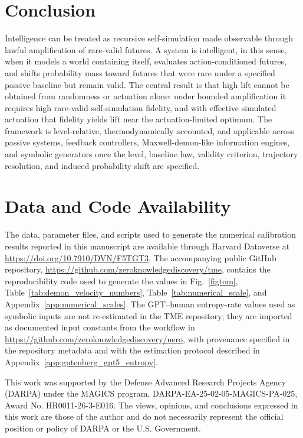 \documentclass[
  aps,
  prresearch,
  reprint,
  amsmath,
  amssymb,
  superscriptaddress,
  nofootinbib,
  longbibliography
]{revtex4-2}
\begin{document}
\section{Conclusion}
\label{sec:conclusion}

Intelligence can be treated as recursive self-simulation made observable through lawful amplification of rare-valid futures. A system is intelligent, in this sense, when it models a world containing itself, evaluates action-conditioned futures, and shifts probability mass toward futures that were rare under a specified passive baseline but remain valid. The central result is that high lift cannot be obtained from randomness or actuation alone: under bounded amplification it requires high rare-valid self-simulation fidelity, and with effective simulated actuation that fidelity yields lift near the actuation-limited optimum. The framework is level-relative, thermodynamically accounted, and applicable across passive systems, feedback controllers, Maxwell-demon-like information engines, and symbolic generators once the level, baseline law, validity criterion, trajectory resolution, and induced probability shift are specified.

\section*{Data and Code Availability}
The data, parameter files, and scripts used to generate the numerical calibration results reported in this manuscript are available through Harvard Dataverse at \url{https://doi.org/10.7910/DVN/F5TGT3}. The accompanying public GitHub repository, \url{https://github.com/zeroknowledgediscovery/tme}, contains the reproducibility code used to generate the values in Fig.~\ref{figtom}, Table~\ref{tab:demon_velocity_numbers}, Table~\ref{tab:numerical_scale}, and Appendix~\ref{app:numerical_scales}. The GPT--human entropy-rate values used as symbolic inputs are not re-estimated in the TME repository; they are imported as documented input constants from the workflow in \url{https://github.com/zeroknowledgediscovery/nero}, with provenance specified in the repository metadata and with the estimation protocol described in Appendix~\ref{app:gutenberg_gpt5_entropy}. 

\begin{acknowledgments}
  This work was supported by the Defense Advanced Research Projects Agency (DARPA) under the MAGICS program, DARPA-EA-25-02-05-MAGICS-PA-025, Award No. HR0011-26-3-E016. The views, opinions, and conclusions expressed in this work are those of the author and do not necessarily represent the official position or policy of DARPA or the U.S. Government.
\end{acknowledgments}
\end{document}
